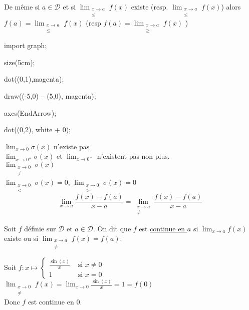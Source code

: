 \begin{rmk}
	De même si $a \in \mathcal{D}$ et si $\lim_{\substack{
			x\to a\\
			 \le	
	}} f(x)$ existe (resp. $\lim_{\substack{
			x\to a\\
			 \le	
	}} f(x)$) alors $f(a) = \lim_{\substack{
		x \to a\\
		\le 
	}} f(x)$ (resp $f(a) = \lim_{\substack{
		x \to a\\
		\ge 
	}} f(x)$ )
\end{rmk}

\begin{exm}
	\begin{center}
		\begin{asy}
			import graph;

			size(5cm);

			dot((0,1),magenta);

			draw((-5,0) -- (5,0), magenta);

			axes(EndArrow);

			dot((0,2), white + 0);
		\end{asy}
	\end{center}

	$\lim_{x \to 0} \sigma(x)$ n'existe pas\\
	$\lim_{x \to 0^+} \sigma(x)$ et $\lim_{x \to 0^-}$ n'existent pas non plus.\\

	$\lim_{\substack{
		x \to 0\\
		\neq
	}} \sigma(x)$\\

	$\lim_{\substack{
		x \to  0\\
		<
	}} \sigma(x) = 0$, $\lim_{\substack{
		x \to 0\\
		>
	}} \sigma(x) = 0$\\

	\[
		\lim_{x \to a}\frac{f(x) - f(a)}{x-a} = \lim_{\substack{
			x \to a\\
			\neq
		}} \frac{f(x) - f(a)}{x - a}
	\]
\end{exm}

\begin{defn}
	Soit $f$ définie sur $\mathcal{D}$ et $a \in \mathcal{D}$. On dit que $f$ est \underline{continue en $a$} si $\lim_{x \to a} f(x)$ existe ou si $\lim_{\substack{
		x \to a\\
		\neq 
	}}f(x) = f(a)$.
\end{defn}

\begin{exm}
	Soit $f: x \mapsto \begin{cases}
		\frac{\sin(x)}{x} & \text{ si } x\neq 0\\
		1 &\text{ si } x = 0
	\end{cases}$\\

	$\lim_{\substack{
		x \to 0\\
		\neq
	}} f(x) = \lim_{x \to  0} \frac{\sin(x)}{x} = 1 = f(0)$ \\
	Donc $f$ est continue en $0$.
\end{exm}

